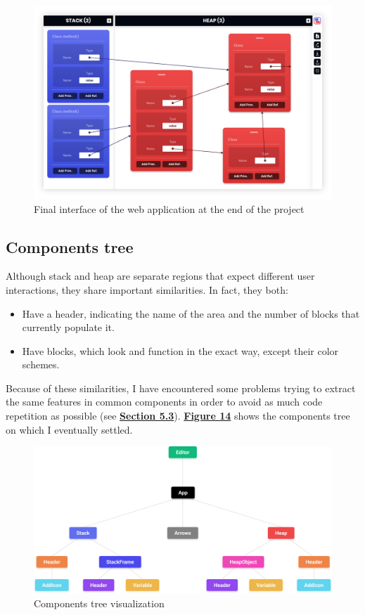 \documentclass[]{usiinfbachelorproject}
\begin{document}
\begin{figure}[h!]
\centering
\includegraphics[width=\textwidth]{figures/final-interface.png}
\caption {Final interface of the web application at the end of the project}
\end{figure}
\subsection{Components tree}

Although stack and heap are separate regions that expect different user interactions, they share important similarities. In fact, they both:

\begin{itemize}
	\item Have a header, indicating the name of the area and the number of blocks that currently populate it.
	\item Have blocks, which look and function in the exact way, except their color schemes.
\end{itemize}

\noindent Because of these similarities, I have encountered some problems trying to extract the same features in common components in order to avoid as much code repetition as possible (see \hyperref[implementation]{\textbf{Section 5.3}}). \hyperref[tree]{\textbf{Figure 14}} shows the components tree on which I eventually settled.

\bigskip

\begin{figure}[h!]
\centering
\includegraphics[width=\textwidth]{figures/tree.png}
\caption {Components tree visualization}
\label{tree}
\end{figure}
\end{document}
